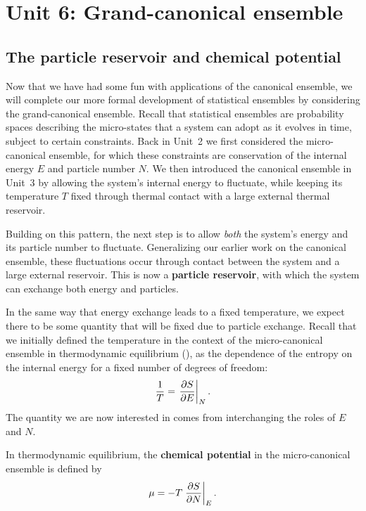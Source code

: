 \renewcommand{\thisunit}{MATH327 Unit 6}
\renewcommand{\moddate}{Last modified 12 Mar.~2025}
\setcounter{section}{6}
\setcounter{subsection}{0}
{}
\section*{Unit 6: Grand-canonical ensemble}
\subsection{The particle reservoir and chemical potential}
Now that we have had some fun with applications of the canonical ensemble, we will complete our more formal development of statistical ensembles by considering the grand-canonical ensemble.
Recall that statistical ensembles are probability spaces describing the micro-states that a system can adopt as it evolves in time, subject to certain constraints.
Back in Unit~2 we first considered the micro-canonical ensemble, for which these constraints are conservation of the internal energy $E$ and particle number $N$.
We then introduced the canonical ensemble in Unit~3 by allowing the system's internal energy to fluctuate, while keeping its temperature $T$ fixed through thermal contact with a large external thermal reservoir.

Building on this pattern, the next step is to allow \textit{both} the system's energy and its particle number to fluctuate.
Generalizing our earlier work on the canonical ensemble, these fluctuations occur through contact between the system and a large external reservoir.
This is now a \textbf{particle reservoir}, with which the system can exchange both energy and particles.

In the same way that energy exchange leads to a fixed temperature, we expect there to be some quantity that will be fixed due to particle exchange.
Recall that we initially defined the temperature in the context of the micro-canonical ensemble in thermodynamic equilibrium (), as the dependence of the entropy on the internal energy for a fixed number of degrees of freedom:
\begin{equation*}
  \frac{1}{T} = \left. \frac{\partial S}{\partial E}\right|_N.
\end{equation*}
The quantity we are now interested in comes from interchanging the roles of $E$ and $N$.

\begin{shaded}
  In thermodynamic equilibrium, the \textbf{chemical potential} in the micro-canonical ensemble is defined by
  \begin{equation}
    \label{eq:chem_pot}
    \mu = -T \left. \frac{\partial S}{\partial N}\right|_E.
  \end{equation}
\end{shaded}

